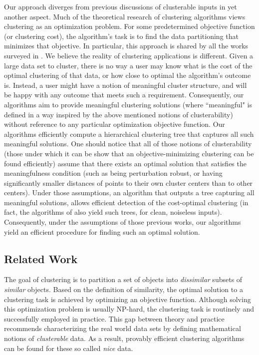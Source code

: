 \documentclass[orivec]{llncs}
\begin{document}
Our approach diverges from previous discussions of clusterable inputs in yet another aspect. Much of the theoretical research of clustering algorithms views clustering as an optimization problem. For some predetermined objective function (or clustering cost), the algorithm's task is to find the data partitioning that minimizes that objective. In particular, this approach is shared by all the works surveyed in \cite{ben2015computational}. We believe the reality of clustering applications is different. Given a large data set to cluster, there is no way a user may know what is the cost of the optimal clustering of that data, or how close to optimal the algorithm's outcome is. Instead, a user might have a notion of meaningful cluster structure, and will be happy with any outcome that meets such a requirement. Consequently, our algorithms aim to provide meaningful clustering solutions (where ``meaningful" is defined in a way inspired by the above mentioned notions of clusterability) without reference to any particular optimization objective function. Our algorithms efficiently compute a hierarchical clustering tree that captures all such meaningful solutions. One should notice that all of those notions of clusterability (those under which it can be show that an objective-minimizing clustering can be found efficiently) assume that there exists an optimal solution that satisfies the meaningfulness condition (such as being perturbation robust, or having significantly smaller distances of points to their own cluster centers than to other centers). Under those assumptions, an algorithm that outputs a tree capturing all meaningful solutions, allows efficient detection of the cost-optimal clustering (in fact, the algorithms of \cite{balcan2012clustering} also yield such trees, for clean, noiseless inputs). Consequently, under the assumptions of those previous works, our algorithms yield an efficient procedure for finding such an optimal solution.

\subsection{Related Work}
The goal of clustering is to partition a set of objects into {\em dissimilar} subsets of {\em similar} objects. Based on the definition of similarity, the optimal solution to a clustering task is achieved by optimizing an objective function. Although solving this optimization problem is usually NP-hard, the clustering task is routinely and successfully employed in practice. This gap between theory and practice recommends characterizing the real world data sets by defining mathematical notions of {\em clusterable} data. As a result, provably efficient clustering algorithms can be found for these so called {\em nice} data.  
\end{document}
